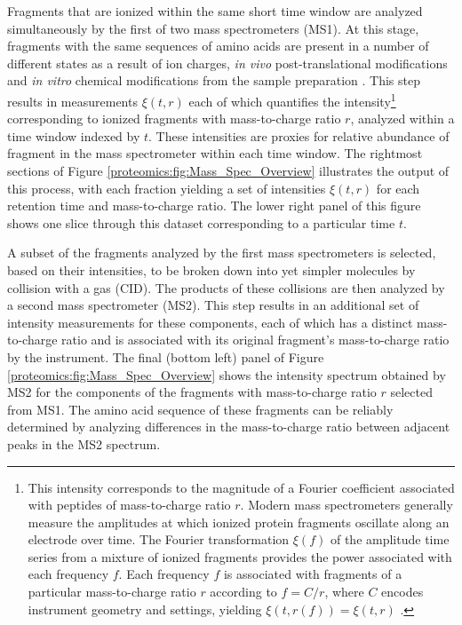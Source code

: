 Fragments that are ionized within the same short time window are analyzed simultaneously by the first of two mass spectrometers (MS1).
At this stage, fragments with the same sequences of amino acids are present in a number of different states as a result of ion charges, \emph{in vivo} post-translational modifications and \emph{in vitro} chemical modifications from the sample preparation \citep{Michalski:2011gm}.
This step results in measurements $\xi(t, r)$ each of which quantifies the intensity\footnote{This intensity corresponds to the magnitude of a Fourier coefficient associated with peptides of mass-to-charge ratio $r$. Modern mass spectrometers generally measure the amplitudes at which ionized protein fragments oscillate along an electrode over time. The Fourier transformation $\xi(f)$ of the amplitude time series from a mixture of ionized fragments provides the power associated with each frequency $f$. Each frequency $f$ is associated with fragments of a particular mass-to-charge ratio $r$ according to $f=C/r$, where $C$ encodes instrument geometry and settings, yielding $\xi(t, r(f)) = \xi(t, r)$ \citep{Scigelova:2006p10560}.
}
%
corresponding to ionized fragments with mass-to-charge ratio $r$, analyzed within a time window indexed by $t$.
These intensities are proxies for relative abundance of fragment in the mass spectrometer within each time window.
%
The rightmost sections of Figure \ref{proteomics:fig:Mass_Spec_Overview} illustrates the output of this process, with each fraction yielding a set of intensities $\xi(t, r)$ for each retention time and mass-to-charge ratio.
The lower right panel of this figure shows one slice through this dataset corresponding to a particular time $t$.

A subset of the fragments analyzed by the first mass spectrometers is selected, based on their intensities, to be broken down into yet simpler molecules by collision with a gas (CID).
The products of these collisions are then analyzed by a second mass spectrometer (MS2).
This step results in an additional set of intensity measurements for these components, each of which has a distinct mass-to-charge ratio and is associated with its original fragment's mass-to-charge ratio by the instrument.
The final (bottom left) panel of Figure \ref{proteomics:fig:Mass_Spec_Overview} shows the intensity spectrum obtained by MS2 for the components of the fragments with mass-to-charge ratio $r$ selected from MS1.
The amino acid sequence of these fragments can be reliably determined by analyzing differences in the mass-to-charge ratio between adjacent peaks in the MS2 spectrum.

